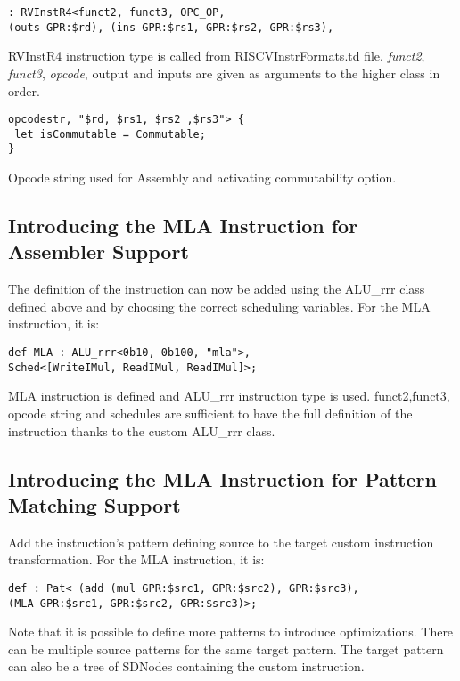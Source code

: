 \begin{lstlisting}
: RVInstR4<funct2, funct3, OPC_OP,
(outs GPR:$rd), (ins GPR:$rs1, GPR:$rs2, GPR:$rs3),
\end{lstlisting}

RVInstR4 instruction type is called from RISCVInstrFormats.td file. \textit{funct2}, \textit{funct3}, \textit{opcode}, output and inputs are given as arguments to the higher class in order.

\begin{lstlisting}
opcodestr, "$rd, $rs1, $rs2 ,$rs3"> {
 let isCommutable = Commutable;
}
\end{lstlisting}

Opcode string used for Assembly and activating commutability option.

\subsection{Introducing the MLA Instruction for Assembler Support}

The definition of the instruction can now be added using the ALU\_rrr class defined above and by choosing the correct scheduling variables. For the MLA instruction, it is:

\begin{lstlisting}
def MLA : ALU_rrr<0b10, 0b100, "mla">,
Sched<[WriteIMul, ReadIMul, ReadIMul]>;
\end{lstlisting}

MLA instruction is defined and ALU\_rrr instruction type is used. funct2,funct3, opcode string and schedules are sufficient to have the full definition of the instruction thanks to the custom ALU\_rrr class.

\subsection{Introducing the MLA Instruction for Pattern Matching Support}
Add the instruction’s pattern defining source to the target custom instruction transformation. For the MLA instruction, it is:

\begin{lstlisting}
def : Pat< (add (mul GPR:$src1, GPR:$src2), GPR:$src3),
(MLA GPR:$src1, GPR:$src2, GPR:$src3)>;
\end{lstlisting}

Note that it is possible to define more patterns to introduce optimizations. There can be multiple source patterns for the same target pattern. The target pattern can also be a tree of SDNodes containing the custom instruction.

